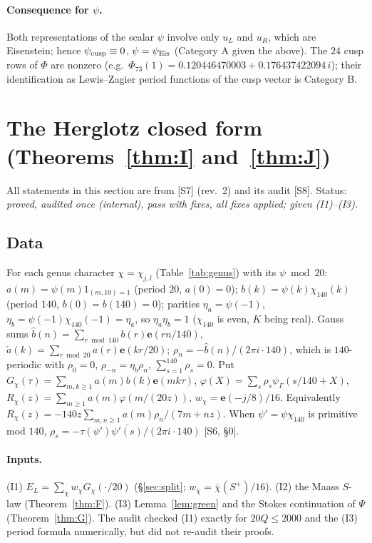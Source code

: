 \documentclass[11pt]{article}
\theoremstyle{definition}
\newcommand{\e}{\mathbf{e}}
\newcommand{\src}[1]{\textup{[S#1]}}
\begin{document}
\paragraph{Consequence for $\psi$.} Both representations of the scalar $\psi$ involve only $u_L$ and $u_R$, which are Eisenstein; hence
$\psi_{\rm cusp}\equiv0$, $\psi=\psi_{\rm Eis}$ (Category A given the above). The $24$ cusp rows of $\Phi$ are nonzero (e.g.\
$\Phi_{73}(1)=0.120446470003+0.176437422094\,i$); their identification as Lewis--Zagier period functions of the cusp vector is Category B.

\section{The Herglotz closed form (Theorems~\ref{thm:I} and~\ref{thm:J})}\label{sec:herglotz}
All statements in this section are from \src{7} (rev.~2) and its audit \src{8}. Status: \emph{proved, audited once (internal), pass with
fixes, all fixes applied; given (I1)--(I3)}.

\subsection{Data}
For each genus character $\chi=\chi_{j,l}$ (Table~\ref{tab:genus}) with its $\psi\bmod20$: $a(m)=\psi(m)1_{(m,10)=1}$ (period $20$, $a(0)=0$);
$b(k)=\psi(k)\chi_{140}(k)$ (period $140$, $b(0)=b(140)=0$); parities $\eta_a=\psi(-1)$, $\eta_b=\psi(-1)\chi_{140}(-1)=\eta_a$, so
$\eta_a\eta_b=1$ ($\chi_{140}$ is even, $K$ being real). Gauss sums
$\widehat b(n)=\sum_{r\bmod140}b(r)\e(rn/140)$, $\check a(k)=\sum_{r\bmod20}a(r)\e(kr/20)$; $\rho_n=-\widehat b(n)/(2\pi i\cdot140)$, which is
$140$-periodic with $\rho_0=0$, $\rho_{-n}=\eta_b\rho_n$, $\sum_{s=1}^{140}\rho_s=0$. Put $G_\chi(\tau)=\sum_{m,k\ge1}a(m)b(k)\e(mk\tau)$,
$\varphi(X)=\sum_s\rho_s\psi_\Gamma(s/140+X)$, $R_\chi(z)=\sum_{m\ge1}a(m)\varphi(m/(20z))$, $w_\chi=\e(-j/8)/16$. Equivalently
$R_\chi(z)=-140z\sum_{m,n\ge1}a(m)\rho_n/(7m+nz)$. When $\psi'=\psi\chi_{140}$ is primitive mod $140$, $\rho_s=-\tau(\psi')\overline{\psi'(s)}/(2\pi i\cdot140)$
\src{6, \S0}.

\paragraph{Inputs.} (I1) $E_L=\sum_\chi w_\chi G_\chi(\cdot/20)$ (\S\ref{sec:split}; $w_\chi=\bar\chi(S^+)/16$). (I2) the Maass $S$-law
(Theorem~\ref{thm:F}). (I3) Lemma~\ref{lem:green} and the Stokes continuation of $\Psi$ (Theorem~\ref{thm:G}). The audit checked (I1) exactly for
$20Q\le2000$ and the (I3) period formula numerically, but did not re-audit their proofs.
\end{document}
